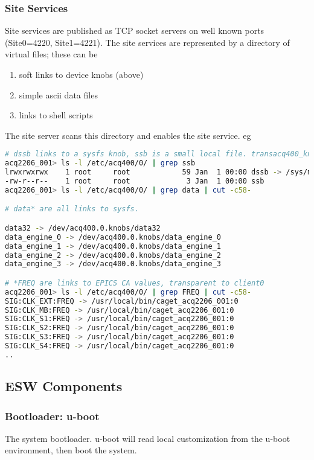 \documentclass[]{article}
\begin{document}
\subsubsection{Site Services}
Site services are published as TCP socket servers on well known ports (Site0=4220, Site1=4221).
The site services are represented by a directory of virtual files; these can be
\begin{enumerate}
	\item soft links to device knobs (above)
	\item simple ascii data files
	\item links to shell scripts
\end{enumerate} 
The site server  scans this directory and enables the site service.
eg
\begin{lstlisting}[language=bash,style=bashstyle,frame=single]
# dssb links to a sysfs knob, ssb is a small local file. transacq400_knobs clients are unaware..
acq2206_001> ls -l /etc/acq400/0/ | grep ssb 
lrwxrwxrwx    1 root     root            59 Jan  1 00:00 dssb -> /sys/module/acq420fmc/parameters/xo_distributor_sample_size
-rw-r--r--    1 root     root             3 Jan  1 00:00 ssb
acq2206_001> ls -l /etc/acq400/0/ | grep data | cut -c58-

# data* are all links to sysfs.

data32 -> /dev/acq400.0.knobs/data32
data_engine_0 -> /dev/acq400.0.knobs/data_engine_0
data_engine_1 -> /dev/acq400.0.knobs/data_engine_1
data_engine_2 -> /dev/acq400.0.knobs/data_engine_2
data_engine_3 -> /dev/acq400.0.knobs/data_engine_3

# *FREQ are links to EPICS CA values, transparent to client0
acq2206_001> ls -l /etc/acq400/0/ | grep FREQ | cut -c58-
SIG:CLK_EXT:FREQ -> /usr/local/bin/caget_acq2206_001:0
SIG:CLK_MB:FREQ -> /usr/local/bin/caget_acq2206_001:0
SIG:CLK_S1:FREQ -> /usr/local/bin/caget_acq2206_001:0
SIG:CLK_S2:FREQ -> /usr/local/bin/caget_acq2206_001:0
SIG:CLK_S3:FREQ -> /usr/local/bin/caget_acq2206_001:0
SIG:CLK_S4:FREQ -> /usr/local/bin/caget_acq2206_001:0
..
\end{lstlisting}


\subsection{ESW Components}

\subsubsection{Bootloader: u-boot}
The system bootloader. u-boot will read local customization from the u-boot environment, then boot the system.
\end{document}
